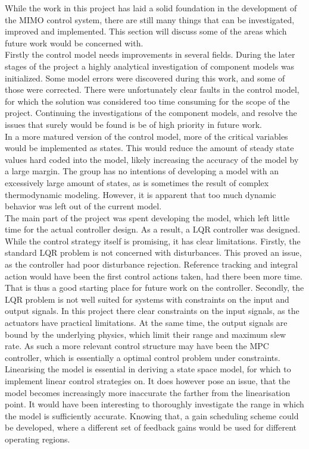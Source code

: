 While the work in this project has laid a solid foundation in the development of the MIMO control system, there are still many things that can be investigated, improved and implemented. This section will discuss some of the areas which future work would be concerned with.\\

Firstly the control model needs improvements in several fields. During the later stages of the project a highly analytical investigation of component models was initialized. Some model errors were discovered during this work, and some of those were corrected. There were unfortunately clear faults in the control model, for which the solution was considered too time consuming for the scope of the project. Continuing the investigations of the component models, and resolve the issues that surely would be found is be of high priority in future work. \\

In a more matured version of the control model, more of the critical variables would be implemented as states. This would reduce the amount of steady state values hard coded into the model, likely increasing the accuracy of the model by a large margin. The group has no intentions of developing a model with an excessively large amount of states, as is sometimes the result of complex thermodynamic modeling. However, it is apparent that too much dynamic behavior was left out of the current model.\\

The main part of the project was spent developing the model, which left little time for the actual controller design. As a result, a LQR controller was designed. While the control strategy itself is promising, it has clear limitations. Firstly, the standard LQR problem is not concerned with disturbances. This proved an issue, as the controller had poor disturbance rejection. Reference tracking and integral action would have been the first control actions taken, had there been more time. That is thus a good starting place for future work on the controller. Secondly, the LQR problem is not well suited for systems with constraints on the input and output signals. In this project there clear constraints on the input signals, as the actuators have practical limitations. At the same time, the output signals are bound by the underlying physics, which limit their range and maximum slew rate. As such a more relevant control structure may have been the MPC controller, which is essentially a optimal control problem under constraints.\\

Linearising the model is essential in deriving a state space model, for which to implement linear control strategies on. It does however pose an issue, that the model becomes increasingly more inaccurate the farther from the linearisation point. It would have been interesting to thoroughly investigate the range in which the model is sufficiently accurate. Knowing that, a gain scheduling scheme could be developed, where a different set of feedback gains would be used for different operating regions. 